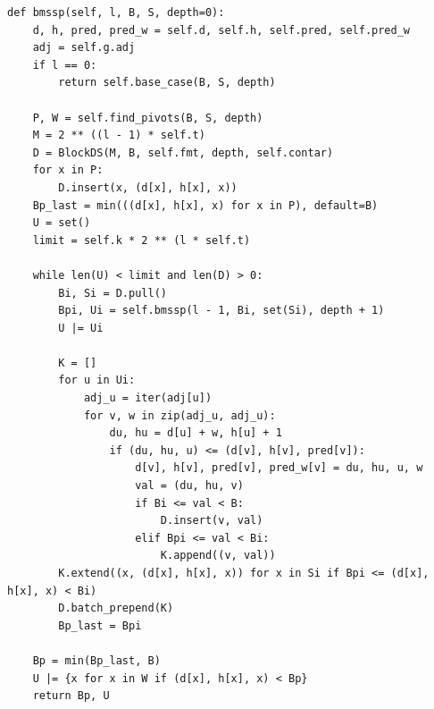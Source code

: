 \begin{lstlisting}[style=pycode, caption={Algorithm 3, BMSSP (\texttt{duan.py}).}, label={lst:bmssp}]
def bmssp(self, l, B, S, depth=0):
    d, h, pred, pred_w = self.d, self.h, self.pred, self.pred_w
    adj = self.g.adj
    if l == 0:
        return self.base_case(B, S, depth)

    P, W = self.find_pivots(B, S, depth)
    M = 2 ** ((l - 1) * self.t)
    D = BlockDS(M, B, self.fmt, depth, self.contar)
    for x in P:
        D.insert(x, (d[x], h[x], x))
    Bp_last = min(((d[x], h[x], x) for x in P), default=B)
    U = set()
    limit = self.k * 2 ** (l * self.t)

    while len(U) < limit and len(D) > 0:
        Bi, Si = D.pull()
        Bpi, Ui = self.bmssp(l - 1, Bi, set(Si), depth + 1)
        U |= Ui

        K = []
        for u in Ui:
            adj_u = iter(adj[u])
            for v, w in zip(adj_u, adj_u):
                du, hu = d[u] + w, h[u] + 1
                if (du, hu, u) <= (d[v], h[v], pred[v]):
                    d[v], h[v], pred[v], pred_w[v] = du, hu, u, w
                    val = (du, hu, v)
                    if Bi <= val < B:
                        D.insert(v, val)
                    elif Bpi <= val < Bi:
                        K.append((v, val))
        K.extend((x, (d[x], h[x], x)) for x in Si if Bpi <= (d[x], h[x], x) < Bi)
        D.batch_prepend(K)
        Bp_last = Bpi

    Bp = min(Bp_last, B)
    U |= {x for x in W if (d[x], h[x], x) < Bp}
    return Bp, U
\end{lstlisting}
